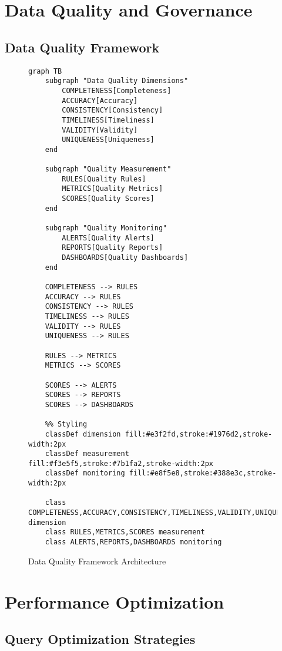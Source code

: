 \documentclass[12pt,a4paper]{article}
\begin{document}
\section{Data Quality and Governance}

\subsection{Data Quality Framework}

\begin{figure}[H]
\centering
\begin{verbatim}
graph TB
    subgraph "Data Quality Dimensions"
        COMPLETENESS[Completeness]
        ACCURACY[Accuracy]
        CONSISTENCY[Consistency]
        TIMELINESS[Timeliness]
        VALIDITY[Validity]
        UNIQUENESS[Uniqueness]
    end
    
    subgraph "Quality Measurement"
        RULES[Quality Rules]
        METRICS[Quality Metrics]
        SCORES[Quality Scores]
    end
    
    subgraph "Quality Monitoring"
        ALERTS[Quality Alerts]
        REPORTS[Quality Reports]
        DASHBOARDS[Quality Dashboards]
    end
    
    COMPLETENESS --> RULES
    ACCURACY --> RULES
    CONSISTENCY --> RULES
    TIMELINESS --> RULES
    VALIDITY --> RULES
    UNIQUENESS --> RULES
    
    RULES --> METRICS
    METRICS --> SCORES
    
    SCORES --> ALERTS
    SCORES --> REPORTS
    SCORES --> DASHBOARDS
    
    %% Styling
    classDef dimension fill:#e3f2fd,stroke:#1976d2,stroke-width:2px
    classDef measurement fill:#f3e5f5,stroke:#7b1fa2,stroke-width:2px
    classDef monitoring fill:#e8f5e8,stroke:#388e3c,stroke-width:2px
    
    class COMPLETENESS,ACCURACY,CONSISTENCY,TIMELINESS,VALIDITY,UNIQUENESS dimension
    class RULES,METRICS,SCORES measurement
    class ALERTS,REPORTS,DASHBOARDS monitoring
\end{verbatim}
\caption{Data Quality Framework Architecture}
\end{figure}

\section{Performance Optimization}

\subsection{Query Optimization Strategies}
\end{document}
